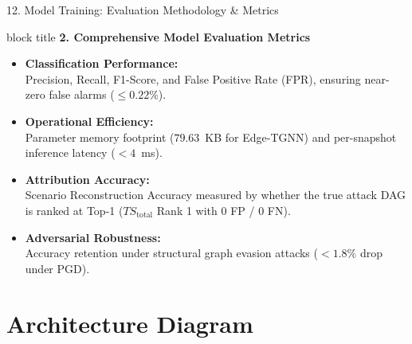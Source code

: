 \documentclass[aspectratio=169,10pt]{beamer}
\begin{document}
\begin{frame}{12. Model Training: Evaluation Methodology \& Metrics}
\vspace{0.3em}
\begin{beamercolorbox}[rounded=true,shadow=false,sep=0.45em,wd=\textwidth]{block title}
\textbf{\scriptsize 2. Comprehensive Model Evaluation Metrics}
\end{beamercolorbox}
\vspace{0.3em}
{\fontsize{8.0pt}{11.5pt}\selectfont
\begin{itemize}\itemsep0.45em
  \item \textbf{Classification Performance:}\\
  Precision, Recall, F1-Score, and False Positive Rate (FPR), ensuring near-zero false alarms ($\le 0.22\%$).
  \item \textbf{Operational Efficiency:}\\
  Parameter memory footprint ($79.63$~KB for Edge-TGNN) and per-snapshot inference latency ($<4$~ms).
  \item \textbf{Attribution Accuracy:}\\
  Scenario Reconstruction Accuracy measured by whether the true attack DAG is ranked at Top-1 ($TS_{\text{total}}$ Rank 1 with 0 FP / 0 FN).
  \item \textbf{Adversarial Robustness:}\\
  Accuracy retention under structural graph evasion attacks ($<1.8\%$ drop under PGD).
\end{itemize}
}
\end{frame}

\section{Architecture Diagram}
\end{document}
